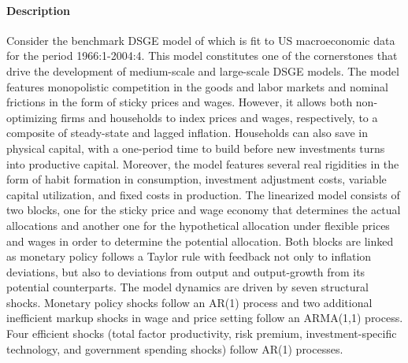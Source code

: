 \documentclass{article}
\begin{document}
\paragraph{Description}
Consider the benchmark DSGE model of \textcite{Smets.Wouters_2007_ShocksFrictionsUS} which is fit to US macroeconomic data for the period 1966:1-2004:4. This model constitutes one of the cornerstones that drive the development of medium-scale and large-scale DSGE models. The model features monopolistic competition in the goods and labor markets and nominal frictions in the form of sticky prices and wages. However, it allows both non-optimizing firms and households to index prices and wages, respectively, to a composite of steady-state and lagged inflation. Households can also save in physical capital, with a one-period time to build before new investments turns into productive capital. Moreover, the model features several real rigidities in the form of habit formation in consumption, investment adjustment costs, variable capital utilization, and fixed costs in production. The linearized model consists of two blocks, one for the sticky price and wage economy that determines the actual allocations and another one for the hypothetical allocation under flexible prices and wages in order to determine the potential allocation. Both blocks are linked as monetary policy follows a Taylor rule with feedback not only to inflation deviations, but also to deviations from output and output-growth from its potential counterparts. The model dynamics are driven by seven structural shocks. Monetary policy shocks follow an AR{(1)} process and two additional inefficient markup shocks in wage and price setting follow an ARMA(1,1) process. Four efficient shocks (total factor productivity, risk premium, investment-specific technology, and government spending shocks) follow AR{(1)} processes.
\end{document}
